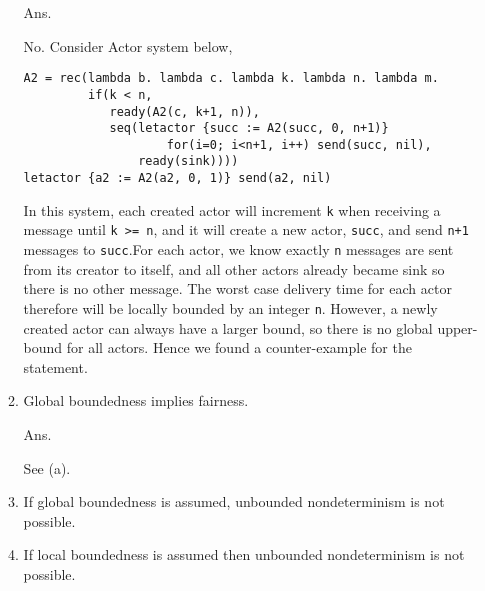 \documentclass{article}
\begin{document}
\begin{enumerate}
\begin{enumerate}
Ans.

No. Consider Actor system below,
\begin{verbatim}
A2 = rec(lambda b. lambda c. lambda k. lambda n. lambda m.
         if(k < n,
            ready(A2(c, k+1, n)),
            seq(letactor {succ := A2(succ, 0, n+1)}
                    for(i=0; i<n+1, i++) send(succ, nil),
                ready(sink))))
letactor {a2 := A2(a2, 0, 1)} send(a2, nil)
\end{verbatim}
In this system, each created actor will increment \texttt{k} when receiving a
message until \texttt{k >= n}, and it will create a new actor, \texttt{succ},
and send \texttt{n+1} messages to \texttt{succ}.For each actor, we know
exactly \texttt{n} messages are sent from its creator to itself, and all
other actors already became sink so there is no other message. The worst case
delivery time for each actor therefore will be locally bounded by an integer
\texttt{n}. However, a newly created actor can always have a larger bound, so
there is no global upper-bound for all actors. Hence we found a
counter-example for the statement.

\item Global boundedness implies fairness.

Ans.

See (a).

\item If global boundedness is assumed, unbounded nondeterminism is not
possible.

\item If local boundedness is assumed then unbounded nondeterminism is not
possible.

\end{enumerate}
\end{enumerate}
\end{document}
